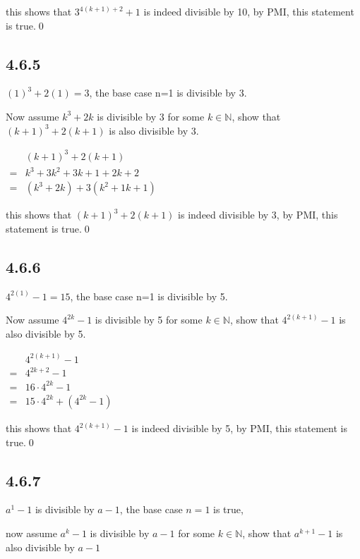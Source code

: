 \documentclass{article}
\begin{document}
this shows that $3^{4(k+1)+2}+1$ is indeed divisible by 10, by PMI, this statement is true.\qed

\subsection*{4.6.5}

$(1)^3+2(1)=3$, the base case n=1 is divisible by 3.

Now assume $k^3+2k$ is divisible by 3 for some $k \in \mathbb{N}$, show that $(k+1)^3+2(k+1)$ is also divisible by 3.

\begin{center}
    $\begin{aligned}&(k+1)^3+2(k+1)\\=&k^3+3k^2+3k+1+2k+2\\=&(k^3+2k)+3\left(k^2+1k+1\right)\end{aligned}$
\end{center}

this shows that $(k+1)^3+2(k+1)$ is indeed divisible by 3, by PMI, this statement is true.\qed

\subsection*{4.6.6}

$4^{2(1)}-1=15$, the base case n=1 is divisible by 5.

Now assume $4^{2k}-1$ is divisible by 5 for some $k \in \mathbb{N}$, show that $4^{2(k+1)}-1$ is also divisible by 5.

\begin{center}
    $\begin{aligned}&4^{2(k+1)}-1\\=&4^{2k+2}-1\\=&16\cdot4^{2k}-1\\=&15\cdot4^{2k}+(4^{2k}-1)\end{aligned}$
\end{center}

this shows that $4^{2(k+1)}-1$ is indeed divisible by 5, by PMI, this statement is true.\qed

\subsection*{4.6.7}

$a^1-1$ is divisible by $a-1$, the base case $n=1$ is true,

now assume $a^k-1$ is divisible by $a-1$ for some $k\in \mathbb{N}$, show that $a^{k+1}-1$ is also divisible by $a-1$
\end{document}
